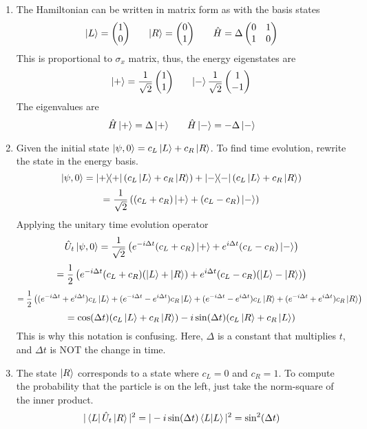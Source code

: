 \begin{sol}
\begin{enumerate}[label=\textbf{(\alph*)}]
\item
The Hamiltonian can be written in matrix form as with the basis states
$$\ket L=\begin{pmatrix}1\\0
\end{pmatrix}\:\:\:\:\:\:\:\:\ket R=\begin{pmatrix}
0\\1\end{pmatrix}\:\:\:\:\:\:\:\:\hat H=\Delta\begin{pmatrix}
0&1\\1&0
\end{pmatrix}$$
This is proportional to $\sigma_x$ matrix, thus, the energy eigenstates are
$$\ket+=\frac{1}{\sqrt{2}}\begin{pmatrix}
1\\1
\end{pmatrix}\:\:\:\:\:\:\:\:\ket-\frac{1}{\sqrt{2}}\begin{pmatrix}
1\\-1
\end{pmatrix}$$ 
The eigenvalues are 
$$\hat H\ket+=\Delta\ket+\:\:\:\:\:\:\:\:\hat H\ket-=-\Delta\ket-$$ 
\item
Given the initial state $\ket{\psi,0}=c_L\ket L+c_R\ket R$. To find time evolution, rewrite the state in the energy basis.
$$\ket{\psi,0}=\ketbra{+}{+}(c_L\ket L+c_R\ket R)+\ketbra{-}{-}(c_L\ket L+c_R\ket R)$$ 
$$=\frac{1}{\sqrt{2}}\left((c_L+c_R)\ket++(c_L-c_R)\ket-\right)$$ 
Applying the unitary time evolution operator
$$\hat U_t\ket{\psi,0}=\frac{1}{\sqrt{2}}\left(e^{-i\Delta t}(c_L+c_R)\ket++e^{i\Delta t}(c_L-c_R)\ket-\right)$$
$$=\frac{1}{2}\left(e^{-i\Delta t}(c_L+c_R)(\ket L+\ket R)+e^{i\Delta t}(c_L-c_R)(\ket L-\ket R)\right)$$
$$=\frac{1}{2}\left((e^{-i\Delta t}+e^{i\Delta t})c_L\ket L+(e^{-i\Delta t}-e^{i\Delta t})c_R\ket L+(e^{-i\Delta t}-e^{i\Delta t})c_L\ket R+(e^{-i\Delta t}+e^{i\Delta t})c_R\ket R\right)$$
$$=\cos(\Delta t)(c_L\ket L+c_R\ket R)-i\sin(\Delta t)(c_L\ket R+c_R\ket L)$$ 
This is why this notation is confusing. Here, $\Delta$ is a constant that multiplies $t$, and $\Delta t$ is NOT the change in time. 
\item
The state $\ket R$ corresponds to a state where $c_L=0$ and $c_R=1$. To compute the probability that the particle is on the left, just take the norm-square of the inner product.
$$|\bra L\hat U_t\ket R|^2=|-i\sin(\Delta t)\braket{L}{L}|^2=\sin^2(\Delta t)$$ 

\end{enumerate}
\end{sol}
